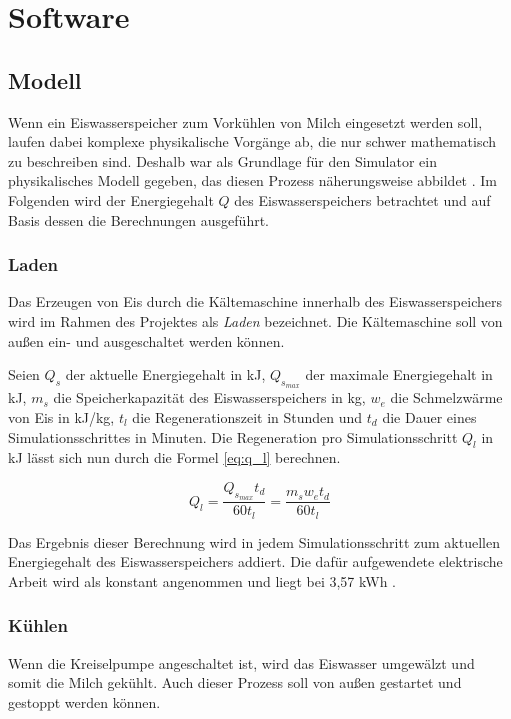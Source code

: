 \chapter{Software}

\section{Modell}
\label{software_model}

Wenn ein Eiswasserspeicher zum Vorkühlen von Milch eingesetzt werden soll, laufen dabei komplexe physikalische Vorgänge ab, die nur schwer mathematisch zu beschreiben sind. Deshalb war als Grundlage für den Simulator ein physikalisches Modell gegeben, das diesen Prozess näherungsweise abbildet \cite{kusow}.
Im Folgenden wird der Energiegehalt $ Q $ des Eiswasserspeichers betrachtet und auf Basis dessen die Berechnungen ausgeführt. %

\subsection{Laden}
Das Erzeugen von Eis durch die Kältemaschine innerhalb des Eiswasserspeichers wird im Rahmen des Projektes als \emph{Laden} bezeichnet. Die Kältemaschine soll von außen ein- und ausgeschaltet werden können.

Seien $ Q_s $ der aktuelle Energiegehalt in kJ, $ Q_{s_{max}} $ der maximale Energiegehalt in kJ, $ m_s $ die Speicherkapazität des Eiswasserspeichers in kg, $ w_e $ die Schmelzwärme von Eis in kJ/kg, $ t_l $ die Regenerationszeit in Stunden und $ t_d $ die Dauer eines Simulationsschrittes in Minuten. Die Regeneration pro Simulationsschritt $ Q_l $ in kJ lässt sich nun durch die Formel \ref{eq:q_l} berechnen.

\begin{equation}\label{eq:q_l}
Q_l = \frac{Q_{s_{max}} t_d}{60 t_l} = \frac{m_s w_e t_d}{60 t_l}
\end{equation}

Das Ergebnis dieser Berechnung wird in jedem Simulationsschritt zum aktuellen Energiegehalt des Eiswasserspeichers addiert. Die dafür aufgewendete elektrische Arbeit wird als konstant angenommen und liegt bei 3,57 kWh \cite{kusow}.

\subsection{Kühlen}
Wenn die Kreiselpumpe angeschaltet ist, wird das Eiswasser umgewälzt und somit die Milch gekühlt. Auch dieser Prozess soll von außen gestartet und gestoppt werden können.

